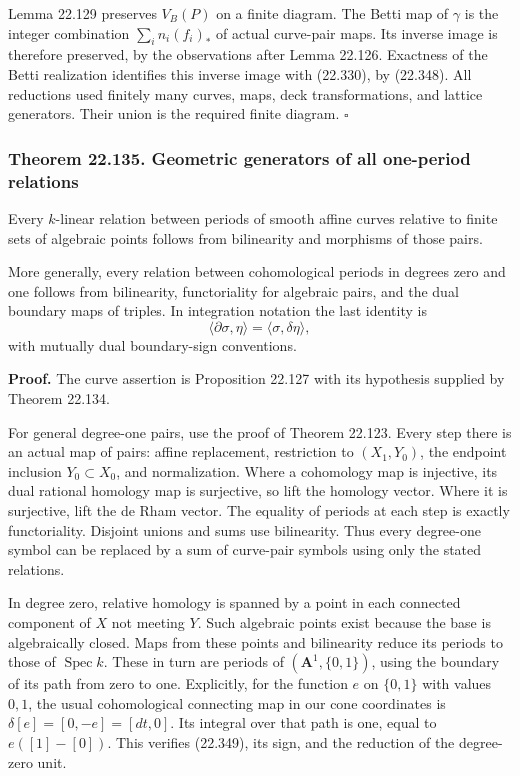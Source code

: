 \documentclass[
  11pt,
  a4paper,
]{article}
\begin{document}
Lemma 22.129 preserves \(V_B(P)\) on a finite diagram. The Betti map of
\(\gamma\) is the integer combination \(\sum_i n_i(f_i)_*\) of actual
curve-pair maps. Its inverse image is therefore preserved, by the
observations after Lemma 22.126. Exactness of the Betti realization
identifies this inverse image with (22.330), by (22.348). All reductions
used finitely many curves, maps, deck transformations, and lattice
generators. Their union is the required finite diagram. \(\square\)

\subsubsection{Theorem 22.135. Geometric generators of all one-period
relations}\label{theorem-22.135.-geometric-generators-of-all-one-period-relations}

Every \(k\)-linear relation between periods of smooth affine curves
relative to finite sets of algebraic points follows from bilinearity and
morphisms of those pairs.

More generally, every relation between cohomological periods in degrees
zero and one follows from bilinearity, functoriality for algebraic
pairs, and the dual boundary maps of triples. In integration notation
the last identity is \[
 \langle\partial\sigma,\eta\rangle
                    =\langle\sigma,\delta\eta\rangle,
 \tag{22.349}
\] with mutually dual boundary-sign conventions.

\textbf{Proof.} The curve assertion is Proposition 22.127 with its
hypothesis supplied by Theorem 22.134.

For general degree-one pairs, use the proof of Theorem 22.123. Every
step there is an actual map of pairs: affine replacement, restriction to
\((X_1,Y_0)\), the endpoint inclusion \(Y_0\subset X_0\), and
normalization. Where a cohomology map is injective, its dual rational
homology map is surjective, so lift the homology vector. Where it is
surjective, lift the de Rham vector. The equality of periods at each
step is exactly functoriality. Disjoint unions and sums use bilinearity.
Thus every degree-one symbol can be replaced by a sum of curve-pair
symbols using only the stated relations.

In degree zero, relative homology is spanned by a point in each
connected component of \(X\) not meeting \(Y\). Such algebraic points
exist because the base is algebraically closed. Maps from these points
and bilinearity reduce its periods to those of \(\operatorname{Spec}k\).
These in turn are periods of \((\mathbf A^1,\{0,1\})\), using the
boundary of its path from zero to one. Explicitly, for the function
\(e\) on \(\{0,1\}\) with values \(0,1\), the usual cohomological
connecting map in our cone coordinates is \(\delta[e]=[0,-e]=[dt,0]\).
Its integral over that path is one, equal to \(e([1]-[0])\). This
verifies (22.349), its sign, and the reduction of the degree-zero unit.
\end{document}
